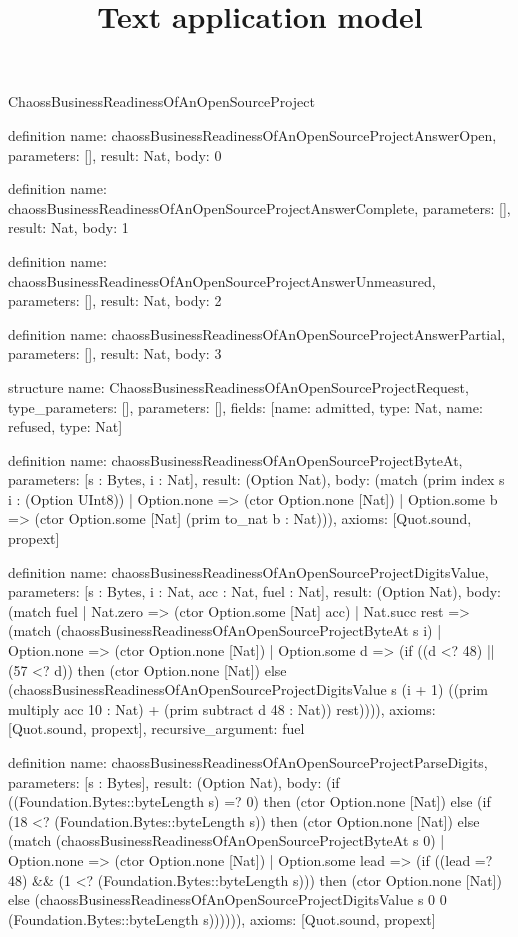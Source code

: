 \begin{lexlean}{ChaossBusinessReadinessOfAnOpenSourceProject}
\title{Text application model}
\begin{semanticmodule}
definition{
  name: chaossBusinessReadinessOfAnOpenSourceProjectAnswerOpen,
  parameters: [],
  result: Nat,
  body: 0
}

definition{
  name: chaossBusinessReadinessOfAnOpenSourceProjectAnswerComplete,
  parameters: [],
  result: Nat,
  body: 1
}

definition{
  name: chaossBusinessReadinessOfAnOpenSourceProjectAnswerUnmeasured,
  parameters: [],
  result: Nat,
  body: 2
}

definition{
  name: chaossBusinessReadinessOfAnOpenSourceProjectAnswerPartial,
  parameters: [],
  result: Nat,
  body: 3
}

structure{
  name: ChaossBusinessReadinessOfAnOpenSourceProjectRequest,
  type_parameters: [],
  parameters: [],
  fields: [{name: admitted, type: Nat}, {name: refused, type: Nat}]
}

definition{
  name: chaossBusinessReadinessOfAnOpenSourceProjectByteAt,
  parameters: [s : Bytes, i : Nat],
  result: (Option Nat),
  body: (match (prim index s i : (Option UInt8))
    | Option.none => (ctor Option.none [Nat])
    | Option.some b => (ctor Option.some [Nat] (prim to_nat b : Nat))),
  axioms: [Quot.sound, propext]
}

definition{
  name: chaossBusinessReadinessOfAnOpenSourceProjectDigitsValue,
  parameters: [s : Bytes, i : Nat, acc : Nat, fuel : Nat],
  result: (Option Nat),
  body: (match fuel
    | Nat.zero => (ctor Option.some [Nat] acc)
    | Nat.succ rest => (match (chaossBusinessReadinessOfAnOpenSourceProjectByteAt s i)
      | Option.none => (ctor Option.none [Nat])
      | Option.some d => (if ((d <? 48) || (57 <? d)) then (ctor Option.none [Nat]) else (chaossBusinessReadinessOfAnOpenSourceProjectDigitsValue s (i + 1) ((prim multiply acc 10 : Nat) + (prim subtract d 48 : Nat)) rest)))),
  axioms: [Quot.sound, propext],
  recursive_argument: fuel
}

definition{
  name: chaossBusinessReadinessOfAnOpenSourceProjectParseDigits,
  parameters: [s : Bytes],
  result: (Option Nat),
  body: (if ((Foundation.Bytes::byteLength s) =? 0) then (ctor Option.none [Nat]) else (if (18 <? (Foundation.Bytes::byteLength s)) then (ctor Option.none [Nat]) else (match (chaossBusinessReadinessOfAnOpenSourceProjectByteAt s 0)
    | Option.none => (ctor Option.none [Nat])
    | Option.some lead => (if ((lead =? 48) && (1 <? (Foundation.Bytes::byteLength s))) then (ctor Option.none [Nat]) else (chaossBusinessReadinessOfAnOpenSourceProjectDigitsValue s 0 0 (Foundation.Bytes::byteLength s)))))),
  axioms: [Quot.sound, propext]
}


\end{semanticmodule}
\end{lexlean}
